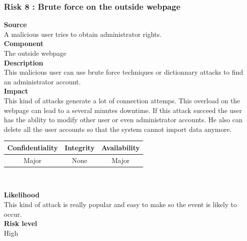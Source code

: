 \documentclass[a4paper,11pt]{article}
\begin{document}
\subsubsection{Risk 8 : Brute force on the outside webpage }
\textbf{Source} \\A malicious user tries to obtain administrator rights.\\
\textbf{Component} \\The outside webpage\\
\textbf{Description}\\This malicious user can use brute force techniques or dictionnary attacks to find an administrator account. \\
\textbf{Impact}\\
This kind of attacks generate a lot of connection attemps. This overload on the webpage can lead to a several minutes downtime. If this attack succeed the user has the ability to modify other user or even administrator accounts. He also can delete all the user accounts so that the system cannot import data anymore.\\
\begin{center}
\begin{tabular}{|c|c|c|}
\hline
\textbf{Confidentiality} & \textbf{Integrity} & \textbf{Availability} \\
\hline
Major & None & Major \\
\hline
\end{tabular}\\
\end{center}
\textbf{Likelihood}\\ This kind of attack is really popular and easy to make so the event is likely to occur.\\
\textbf{Risk level}\\High\\
\end{document}
